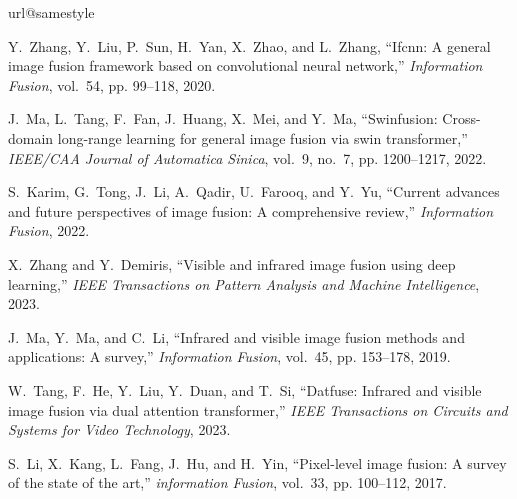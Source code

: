 \documentclass[journal]{IEEEtran}
\begin{document}
\begin{thebibliography}{10}
\providecommand{\url}[1]{#1}
\csname url@samestyle\endcsname
\providecommand{\newblock}{\relax}
\providecommand{\bibinfo}[2]{#2}
\providecommand{\BIBentrySTDinterwordspacing}{\spaceskip=0pt\relax}
\providecommand{\BIBentryALTinterwordstretchfactor}{4}
\providecommand{\BIBentryALTinterwordspacing}{\spaceskip=\fontdimen2\font plus
\BIBentryALTinterwordstretchfactor\fontdimen3\font minus
  \fontdimen4\font\relax}
\providecommand{\BIBforeignlanguage}[2]{{%
\expandafter\ifx\csname l@#1\endcsname\relax
\typeout{** WARNING: IEEEtran.bst: No hyphenation pattern has been}%
\typeout{** loaded for the language `#1'. Using the pattern for}%
\typeout{** the default language instead.}%
\else
\language=\csname l@#1\endcsname
\fi
#2}}
\providecommand{\BIBdecl}{\relax}
\BIBdecl

Y.~Zhang, Y.~Liu, P.~Sun, H.~Yan, X.~Zhao, and L.~Zhang, ``Ifcnn: A general
  image fusion framework based on convolutional neural network,''
  \emph{Information Fusion}, vol.~54, pp. 99--118, 2020.

J.~Ma, L.~Tang, F.~Fan, J.~Huang, X.~Mei, and Y.~Ma, ``Swinfusion: Cross-domain
  long-range learning for general image fusion via swin transformer,''
  \emph{IEEE/CAA Journal of Automatica Sinica}, vol.~9, no.~7, pp. 1200--1217,
  2022.

S.~Karim, G.~Tong, J.~Li, A.~Qadir, U.~Farooq, and Y.~Yu, ``Current advances
  and future perspectives of image fusion: A comprehensive review,''
  \emph{Information Fusion}, 2022.

X.~Zhang and Y.~Demiris, ``Visible and infrared image fusion using deep
  learning,'' \emph{IEEE Transactions on Pattern Analysis and Machine
  Intelligence}, 2023.

J.~Ma, Y.~Ma, and C.~Li, ``Infrared and visible image fusion methods and
  applications: A survey,'' \emph{Information Fusion}, vol.~45, pp. 153--178,
  2019.

W.~Tang, F.~He, Y.~Liu, Y.~Duan, and T.~Si, ``Datfuse: Infrared and visible
  image fusion via dual attention transformer,'' \emph{IEEE Transactions on
  Circuits and Systems for Video Technology}, 2023.

S.~Li, X.~Kang, L.~Fang, J.~Hu, and H.~Yin, ``Pixel-level image fusion: A
  survey of the state of the art,'' \emph{information Fusion}, vol.~33, pp.
  100--112, 2017.


\end{thebibliography}
\end{document}
